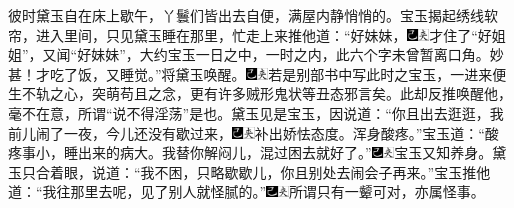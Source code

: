 彼时黛玉自在床上歇午，丫鬟们皆出去自便，满屋内静悄悄的。宝玉揭起绣线软帘，进入里间，只见黛玉睡在那里，忙走上来推他道：“好妹妹，{\includegraphics[width=3mm]{../Images/00003}\includegraphics[width=3mm]{../Images/00012}\footnotesize \kaishu 才住了“好姐姐”，又闻“好妹妹”，大约宝玉一日之中，一时之内，此六个字未曾暂离口角。妙甚！}才吃了饭，又睡觉。”将黛玉唤醒。{\includegraphics[width=3mm]{../Images/00003}\includegraphics[width=3mm]{../Images/00012}\footnotesize \kaishu 若是别部书中写此时之宝玉，一进来便生不轨之心，突萌苟且之念，更有许多贼形鬼状等丑态邪言矣。此却反推唤醒他，毫不在意，所谓“说不得淫荡”是也。}黛玉见是宝玉，因说道：“你且出去逛逛，我前儿闹了一夜，今儿还没有歇过来，{\includegraphics[width=3mm]{../Images/00003}\includegraphics[width=3mm]{../Images/00012}\footnotesize \kaishu 补出娇怯态度。}浑身酸疼。”宝玉道：“酸疼事小，睡出来的病大。我替你解闷儿，混过困去就好了。”{\includegraphics[width=3mm]{../Images/00003}\includegraphics[width=3mm]{../Images/00012}\footnotesize \kaishu 宝玉又知养身。}黛玉只合着眼，说道：“我不困，只略歇歇儿，你且别处去闹会子再来。”宝玉推他道：“我往那里去呢，见了别人就怪腻的。”{\includegraphics[width=3mm]{../Images/00003}\includegraphics[width=3mm]{../Images/00012}\footnotesize \kaishu 所谓只有一颦可对，亦属怪事。}

